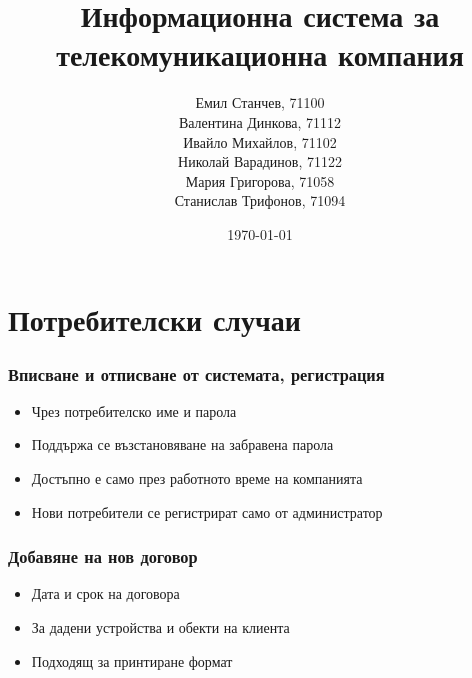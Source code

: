 \documentclass{beamer}
\title[ИС за телекомуникационна компания]{Информационна система за телекомуникационна компания}
\author{\tiny {Емил Станчев, 71100 \\
	Валентина Динкова, 71112 \\
	Ивайло Михайлов, 71102 \\
	Николай Варадинов, 71122 \\
	Мария Григорова, 71058 \\
	Станислав Трифонов, 71094 
	}
	}
\institute{ФМИ}
\date{\tiny{\today}}
\begin{document}
\begin{frame}
  \titlepage
\end{frame}

\section{Потребителски случаи}
\begin{frame}
  \frametitle{Вписване и отписване от системата, регистрация}
    \begin{itemize}
      \item Чрез потребителско име и парола
      \item Поддържа се възстановяване на забравена парола
      \item Достъпно е само през работното време на компанията
      \item Нови потребители се регистрират само от администратор
    \end{itemize}
\end{frame}

\begin{frame}
  \frametitle{Добавяне на нов договор}
    \begin{itemize}
	\item Дата и срок на договора
	\item За дадени устройства и обекти на клиента
	\item Подходящ за принтиране формат
    \end{itemize}
\end{frame}
\end{document}
